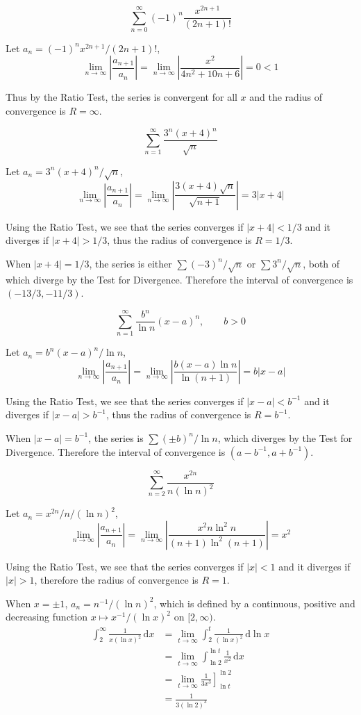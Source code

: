 \documentclass[a4paper,12pt]{article}
\newcommand{\ud}{\,\mathrm{d}}
\begin{document}
\[\sum_{n=0}^\infty (-1)^n\frac{x^{2n+1}}{(2n + 1)!}\tag{14}\]

Let $a_n = (-1)^n x^{2n+1}/(2n + 1)!$,
\[\lim_{n\to\infty}\left|\frac{a_{n+1}}{a_n}\right|
= \lim_{n\to\infty}\left|\frac{x^2}{4n^2 + 10n + 6}\right|
= 0 < 1\]

Thus by the Ratio Test, the series is convergent for all $x$ and the radius of
convergence is $R = \infty$.

\[\sum_{n=1}^\infty\frac{3^n (x+4)^n}{\sqrt n}\tag{17}\]

Let $a_n = 3^n (x+4)^n / \sqrt n$,
\[\lim_{n\to\infty}\left|\frac{a_{n+1}}{a_n}\right|
= \lim_{n\to\infty}\left|\frac{3(x + 4)\sqrt n}{\sqrt{n + 1}}\right|
= 3|x + 4|\]

Using the Ratio Test, we see that the series converges if $|x + 4| < 1/3$ and
it diverges if $|x + 4| > 1/3$, thus the radius of convergence is $R = 1/3$.

When $|x + 4| = 1/3$, the series is either $\sum (-3)^n / \sqrt n$ or
$\sum 3^n / \sqrt n$, both of which diverge by the Test for Divergence.
Therefore the interval of convergence is $(-13/3, -11/3)$.

\[\sum_{n=1}^\infty\frac{b^n}{\ln n}(x - a)^n,\qquad b > 0\tag{22}\]

Let $a_n = b^n (x - a)^n / \ln n$,
\[\lim_{n\to\infty}\left|\frac{a_{n+1}}{a_n}\right|
= \lim_{n\to\infty}\left|\frac{b(x - a)\ln n}{\ln(n + 1)}\right|
= b|x - a|\]

Using the Ratio Test, we see that the series converges if $|x - a| < b^{-1}$
and it diverges if $|x - a| > b^{-1}$, thus the radius of convergence is
$R = b^{-1}$.

When $|x - a| = b^{-1}$, the series is $\sum (\pm b)^n / \ln n$, which diverges
by the Test for Divergence. Therefore the interval of convergence is
$(a - b^{-1}, a + b^{-1})$.

\[\sum_{n=2}^\infty\frac{x^{2n}}{n(\ln n)^2}\tag{26}\]

Let $a_n = x^{2n} / n / (\ln n)^2$,
\[\lim_{n\to\infty}\left|\frac{a_{n+1}}{a_n}\right|
= \lim_{n\to\infty}\left|\frac{x^2 n \ln^2 n}{(n + 1)\ln^2(n + 1)}\right|
= x^2\]

Using the Ratio Test, we see that the series converges if $|x| < 1$ and it
diverges if $|x| > 1$, therefore the radius of convergence is $R = 1$.

When $x = \pm 1$, $a_n = n^{-1}/(\ln n)^2$, which is defined by a continuous,
positive and decreasing function $x \mapsto x^{-1}/(\ln x)^2$ on $[2, \infty)$.
\begin{align*}
   \int_2^\infty\frac{1}{x(\ln x)^2}\ud x
&= \lim_{t\to\infty}\int_2^t\frac{1}{(\ln x)^2}\ud\ln x\\
&= \lim_{t\to\infty}\int_{\ln 2}^{\ln t}\frac{1}{x^2}\ud x\\
&= \lim_{t\to\infty}\left.\frac{1}{3x^3}\right]_{\ln t}^{\ln 2}\\
&= \frac{1}{3(\ln 2)^3}
\end{align*}
\end{document}
